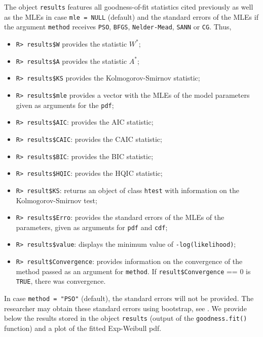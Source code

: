 \documentclass[10pt,letterpaper]{article}
\begin{document}
The object \texttt{results} features all goodness-of-fit statistics cited previously as well as the MLEs in case \texttt{mle = NULL} (default)
and the standard errors of the MLEs if the argument \texttt{method} receives \texttt{PSO}, \texttt{BFGS}, \texttt{Nelder-Mead}, \texttt{SANN} or \texttt{CG}.
Thus,

\begin{itemize}
	\item \texttt{R> results\$W} provides the statistic $W^*$;
	\item \texttt{R> results\$A} provides the statistic $A^*$;
	\item \texttt{R> results\$KS} provides the Kolmogorov-Smirnov statistic;
	\item \texttt{R> results\$mle} provides a vector with the MLEs of the model parameters given as arguments for the \texttt{pdf};
	\item \texttt{R> results\$AIC}: provides the AIC statistic;
	\item \texttt{R> results\$CAIC}: provides the CAIC statistic;
	\item \texttt{R> results\$BIC}: provides the BIC statistic;
	\item \texttt{R> results\$HQIC}: provides the HQIC statistic;
	\item \texttt{R> result\$KS}: returns an object of class \texttt{htest} with information on the Kolmogorov-Smirnov test;
	\item \texttt{R> results\$Erro}: provides the standard errors of the MLEs of the parameters, given as arguments for \texttt{pdf} and \texttt{cdf};
	\item \texttt{R> results\$value}: displays the minimum value of \texttt{-log(likelihood)};
	\item \texttt{R> result\$Convergence}: provides information on the convergence of the method passed as an argument for \texttt{method}.
If \texttt{result\$Convergence} == 0 is \texttt{TRUE}, there was convergence.
\end{itemize}

In case \texttt{method = "PSO"} (default), the standard errors will not be provided.
The researcher may obtain these
standard errors using bootstrap, see \cite{davisonhinckley1997}.
We provide below the results
stored in the object \texttt{results} (output of the \texttt{goodness.fit()} function) and a plot of the fitted Exp-Weibull pdf.
\end{document}
